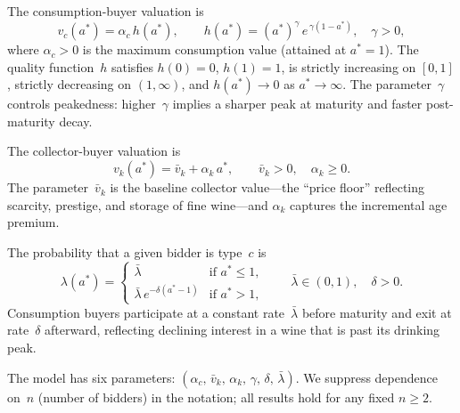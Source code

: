 \begin{assumption}
\label{as:vc}
The consumption-buyer valuation is
\begin{equation}
  v_{c}(a^{*})
  = \alpha_{c}\, h(a^{*}),
  \qquad
  h(a^{*})
  = (a^{*})^{\gamma}\, e^{\,\gamma(1 - a^{*})},
  \quad \gamma > 0,
  \label{eq:vc}
\end{equation}
where $\alpha_{c} > 0$ is the maximum consumption value (attained at
$a^{*} = 1$).  The quality function~$h$ satisfies $h(0) = 0$,
$h(1) = 1$, is strictly increasing on $[0,1]$, strictly decreasing
on $(1,\infty)$, and $h(a^{*}) \to 0$ as $a^{*} \to \infty$.  The
parameter~$\gamma$ controls peakedness: higher~$\gamma$ implies a
sharper peak at maturity and faster post-maturity decay.
\end{assumption}

\begin{assumption}
\label{as:vk}
The collector-buyer valuation is
\begin{equation}
  v_{k}(a^{*})
  = \bar{v}_{k} + \alpha_{k}\, a^{*},
  \qquad
  \bar{v}_{k} > 0,
  \quad \alpha_{k} \geq 0.
  \label{eq:vk}
\end{equation}
The parameter~$\bar{v}_{k}$ is the baseline collector value---the
``price floor'' reflecting scarcity, prestige, and storage of fine
wine---and $\alpha_{k}$ captures the incremental age premium.
\end{assumption}

\begin{assumption}
\label{as:lambda}
The probability that a given bidder is type~$c$ is
\begin{equation}
  \lambda(a^{*})
  = \begin{cases}
      \bar{\lambda}
        & \text{if } a^{*} \leq 1, \\[4pt]
      \bar{\lambda}\, e^{-\delta(a^{*} - 1)}
        & \text{if } a^{*} > 1,
    \end{cases}
  \qquad
  \bar{\lambda} \in (0,1),
  \quad \delta > 0.
  \label{eq:lambda}
\end{equation}
Consumption buyers participate at a constant rate~$\bar{\lambda}$
before maturity and exit at rate~$\delta$ afterward, reflecting
declining interest in a wine that is past its drinking peak.
\end{assumption}

\noindent
The model has six parameters:
$(\alpha_{c},\, \bar{v}_{k},\, \alpha_{k},\, \gamma,\, \delta,\,
\bar{\lambda})$.  We suppress dependence on~$n$ (number of bidders)
in the notation; all results hold for any fixed $n \geq 2$.

